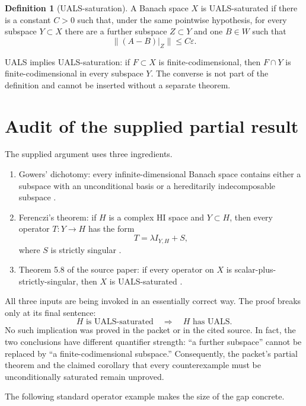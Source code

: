 \documentclass[11pt]{article}
\theoremstyle{definition}
\newtheorem{definition}[theorem]{Definition}
\theoremstyle{remark}
\begin{document}
\begin{definition}[UALS-saturation]\label{def:saturated}
A Banach space $X$ is UALS-saturated if there is a constant $C>0$ such that, under the same pointwise hypothesis, for every subspace $Y\subset X$ there are a further subspace $Z\subset Y$ and one $B\in W$ such that
\[
  \|(A-B)|_Z\|\leq C\varepsilon.
\]
\end{definition}

UALS implies UALS-saturation: if $F\subset X$ is finite-codimensional, then $F\cap Y$ is finite-codimensional in every subspace $Y$.  The converse is not part of the definition and cannot be inserted without a separate theorem.

\section{Audit of the supplied partial result}

The supplied argument uses three ingredients.

\begin{enumerate}[label=(\roman*),leftmargin=2.2em]
\item Gowers' dichotomy: every infinite-dimensional Banach space contains either a subspace with an unconditional basis or a hereditarily indecomposable subspace \cite{Gowers,FK}.
\item Ferenczi's theorem: if $H$ is a complex HI space and $Y\subset H$, then every operator $T:Y\to H$ has the form
\[
  T=\lambda I_{Y,H}+S,
\]
where $S$ is strictly singular \cite{Ferenczi}.
\item Theorem 5.8 of the source paper: if every operator on $X$ is scalar-plus-strictly-singular, then $X$ is UALS-saturated \cite[Theorem 5.8]{AGLM}.
\end{enumerate}

All three inputs are being invoked in an essentially correct way.  The proof breaks only at its final sentence:
\[
  H\text{ is UALS-saturated}\quad\Longrightarrow\quad H\text{ has UALS}.
\]
No such implication was proved in the packet or in the cited source.  In fact, the two conclusions have different quantifier strength: ``a further subspace'' cannot be replaced by ``a finite-codimensional subspace.''  Consequently, the packet's partial theorem and the claimed corollary that every counterexample must be unconditionally saturated remain unproved.

The following standard operator example makes the size of the gap concrete.
\end{document}
